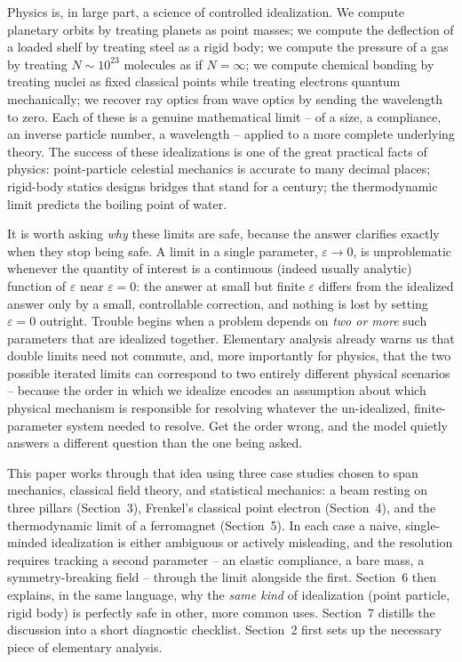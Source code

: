 \documentclass[11pt]{article}
\begin{document}
Physics is, in large part, a science of controlled idealization. We compute planetary orbits by treating planets as point masses; we compute the deflection of a loaded shelf by treating steel as a rigid body; we compute the pressure of a gas by treating $N\sim10^{23}$ molecules as if $N=\infty$; we compute chemical bonding by treating nuclei as fixed classical points while treating electrons quantum mechanically; we recover ray optics from wave optics by sending the wavelength to zero. Each of these is a genuine mathematical limit -- of a size, a compliance, an inverse particle number, a wavelength -- applied to a more complete underlying theory. The success of these idealizations is one of the great practical facts of physics: point-particle celestial mechanics is accurate to many decimal places; rigid-body statics designs bridges that stand for a century; the thermodynamic limit predicts the boiling point of water.

It is worth asking \emph{why} these limits are safe, because the answer clarifies exactly when they stop being safe. A limit in a single parameter, $\varepsilon\to0$, is unproblematic whenever the quantity of interest is a continuous (indeed usually analytic) function of $\varepsilon$ near $\varepsilon=0$: the answer at small but finite $\varepsilon$ differs from the idealized answer only by a small, controllable correction, and nothing is lost by setting $\varepsilon=0$ outright. Trouble begins when a problem depends on \emph{two or more} such parameters that are idealized together. Elementary analysis already warns us that double limits need not commute, and, more importantly for physics, that the two possible iterated limits can correspond to two entirely different physical scenarios -- because the order in which we idealize encodes an assumption about which physical mechanism is responsible for resolving whatever the un-idealized, finite-parameter system needed to resolve. Get the order wrong, and the model quietly answers a different question than the one being asked.

This paper works through that idea using three case studies chosen to span mechanics, classical field theory, and statistical mechanics: a beam resting on three pillars (Section~3), Frenkel's classical point electron (Section~4), and the thermodynamic limit of a ferromagnet (Section~5). In each case a naive, single-minded idealization is either ambiguous or actively misleading, and the resolution requires tracking a second parameter -- an elastic compliance, a bare mass, a symmetry-breaking field -- through the limit alongside the first. Section~6 then explains, in the same language, why the \emph{same kind} of idealization (point particle, rigid body) is perfectly safe in other, more common uses. Section~7 distills the discussion into a short diagnostic checklist. Section~2 first sets up the necessary piece of elementary analysis.
\end{document}
